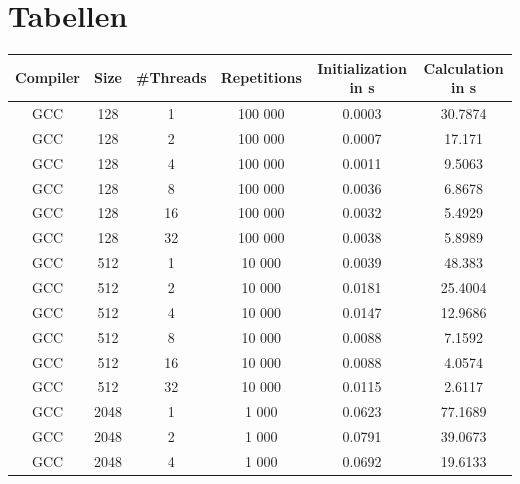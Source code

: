 \documentclass[german,plainarticle,hyperref,utf8]{zihpub}
\begin{document}
	\section{Tabellen} \label{tables}
	\begin{table}[h]
		\begin{center}
			\begin{tabular}{||c c c c c c||}
				\hline
				Compiler & Size  & \#Threads & Repetitions & Initialization in s & Calculation in s \\ [1ex]
				\hline\hline
				GCC      & 128   & 1         & 100 000     & 0.0003              & 30.7874          \\
				\hline
				GCC      & 128   & 2         & 100 000     & 0.0007              & 17.171           \\
				\hline
				GCC      & 128   & 4         & 100 000     & 0.0011              & 9.5063           \\
				\hline
				GCC      & 128   & 8         & 100 000     & 0.0036              & 6.8678           \\
				\hline
				GCC      & 128   & 16        & 100 000     & 0.0032              & 5.4929           \\
				\hline
				GCC      & 128   & 32        & 100 000     & 0.0038              & 5.8989           \\
				\hline\hline
				GCC      & 512   & 1         & 10 000      & 0.0039              & 48.383           \\
				\hline
				GCC      & 512   & 2         & 10 000      & 0.0181              & 25.4004          \\
				\hline
				GCC      & 512   & 4         & 10 000      & 0.0147              & 12.9686          \\
				\hline
				GCC      & 512   & 8         & 10 000      & 0.0088              & 7.1592           \\
				\hline
				GCC      & 512   & 16        & 10 000      & 0.0088              & 4.0574           \\
				\hline
				GCC      & 512   & 32        & 10 000      & 0.0115              & 2.6117           \\
				\hline\hline
				GCC      & 2048  & 1         & 1 000       & 0.0623              & 77.1689          \\
				\hline
				GCC      & 2048  & 2         & 1 000       & 0.0791              & 39.0673          \\
				\hline
				GCC      & 2048  & 4         & 1 000       & 0.0692              & 19.6133          \\

\end{tabular}
\end{center}
\end{table}
\end{document}
